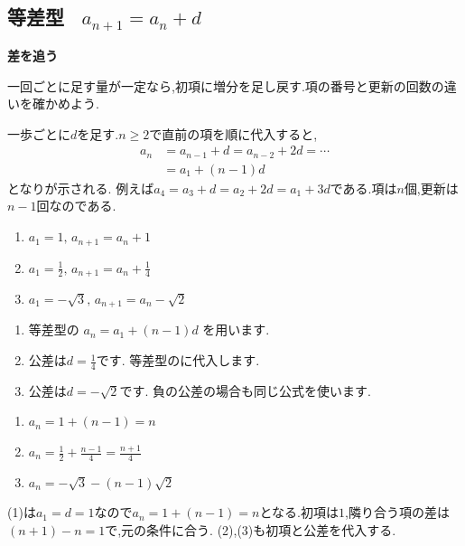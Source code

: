 
  \subsection{\texorpdfstring{等差型 \, $a_{n+1}=a_n+d$}{等差型}}\label{節：等差型}
  \begin{bookpoint}
    \textbf{差を追う}\par
    一回ごとに足す量が一定なら,初項に増分を足し戻す.項の番号と更新の回数の違いを確かめよう.
  \end{bookpoint}
    一歩ごとに$d$を足す.$n\ge2$で直前の項を順に代入すると,
    \begin{align*}
      a_n&=a_{n-1}+d=a_{n-2}+2d=\cdots\\
         &=a_1+(n-1)d
    \end{align*}
    となりが示される.
    例えば$a_4=a_3+d=a_2+2d=a_1+3d$である.項は$n$個,更新は$n-1$回なのである.

    \noindent {}\par\nobreak
    \begin{enumerate}[label=(\arabic*),parsep=3pt,format=\bookitemlink{example-arithmetic-1}{problem}{answer}]
      \item $\displaystyle a_1=1,\, a_{n+1}=a_n+1$
      \item $\displaystyle a_1=\frac{1}{2},\, a_{n+1}=a_n+\frac{1}{4}$
      \item $\displaystyle a_1=-\sqrt{3},\, a_{n+1}=a_n-\sqrt{2}$
    \end{enumerate}

    \noindent{}\par\nobreak
    \begin{enumerate}[label=(\arabic*),parsep=3pt,format=\bookitemlink{example-arithmetic-1}{hint}{problem}]
      \item 等差型の
            $\displaystyle a_n=a_1+(n-1)d$
            を用います.
      \item 公差は$\displaystyle d=\frac14$です.
            等差型のに代入します.
      \item 公差は$\displaystyle d=-\sqrt2$です.
            負の公差の場合も同じ公式を使います.
    \end{enumerate}

    \noindent{}\par\nobreak
    \begin{enumerate}[label=(\arabic*),parsep=3pt,format=\bookitemlink{example-arithmetic-1}{answer}{problem}]
      \item $\displaystyle a_n=1+(n-1)=n$
      \item $\displaystyle a_n=\frac12+\frac{n-1}{4}
            =\frac{n+1}{4}$
      \item $\displaystyle a_n=-\sqrt3-(n-1)\sqrt2$
    \end{enumerate}

    \noindent{}\par\nobreak
    (1)は$a_1=d=1$なので$a_n=1+(n-1)=n$となる.初項は$1$,隣り合う項の差は$(n+1)-n=1$で,元の条件に合う.
    (2),(3)も初項と公差を代入する.
